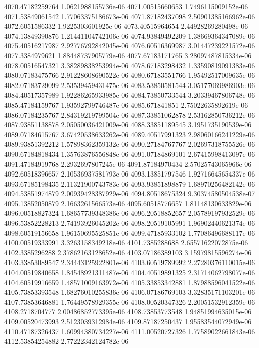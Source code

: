 {4070.47182259764 1.0621988155736e-06
4071.00515660653 1.7496115009152e-06
4071.53849061542 1.77063375186673e-06
4071.87182437098 2.50901385166962e-06
4072.6051586332 1.9225303601925e-06
4073.40515964654 2.44928269280498e-06
4074.13849390876 1.21441104742106e-06
4074.93849492209 1.38669364347089e-06
4075.40516217987 2.92776792842045e-06
4076.60516369987 3.01447239221572e-06
4077.3384979621 1.88448737905779e-06
4077.67183171765 3.28097487815334e-06
4078.00516547321 3.38289838253994e-06
4078.67183298432 1.33590819091383e-06
4080.07183475766 2.91228608690522e-06
4080.67183551766 1.95492517009635e-06
4082.07183729099 2.53539459431475e-06
4083.53850581544 3.05177069986903e-06
4084.40517357989 1.92286265933985e-06
4084.73850733544 3.20339467806748e-06
4085.47184159767 1.93592799746487e-06
4085.671841851 2.75022635892619e-06
4086.07184235767 2.84319219799504e-06
4087.33851062878 2.53162850736212e-06
4087.93851138878 2.05050036421009e-06
4088.33851189545 3.1951735190539e-06
4089.07184615767 3.67420538633262e-06
4089.40517991323 2.98060166241229e-06
4089.93851392212 1.57898362359132e-06
4090.27184767767 2.02697318755526e-06
4090.67184818434 1.35763876556848e-06
4091.07184869101 2.67415998413097e-06
4091.47184919768 2.2932697807245e-06
4091.87184970434 2.57025743065966e-06
4092.60518396657 2.10536937581793e-06
4093.13851797546 1.92716645654337e-06
4093.67185198435 2.11321900743783e-06
4093.93851898879 1.68970256482142e-06
4094.53851974879 2.00939428387929e-06
4094.80518675324 9.30374580504538e-07
4095.13852050879 2.1663261566573e-06
4095.60518776657 1.81148130633829e-06
4096.00518827324 1.68657739348386e-06
4096.20518852657 2.05789197932529e-06
4096.53852228213 2.74193926045202e-06
4098.20519105991 1.96902440621374e-06
4098.60519156658 1.96150695525851e-06
4099.47185933102 1.77086496688117e-06
4100.00519333991 3.3263158349218e-06
4101.7385288688 2.65571622072875e-06
4102.3385296288 2.37862163128652e-06
4103.07186389103 3.15979815596274e-06
4103.33853089547 2.34443125922801e-06
4103.60519789992 2.27280376110015e-06
4104.00519840658 1.84548921311487e-06
4104.40519891325 2.31714062798077e-06
4104.60519916659 1.48571009163972e-06
4105.33853342881 1.87988596041522e-06
4105.73853393548 1.68276010255836e-06
4106.07186769103 3.32835171103201e-06
4107.73853646881 1.76449578929355e-06
4108.00520347326 2.20051532912359e-06
4108.2718704777 2.00486852773395e-06
4108.73853773548 1.94851994635015e-06
4109.00520473993 2.5123039312984e-06
4109.87187250437 1.95583544072949e-06
4110.47187326437 1.60994380734227e-06
4111.00520727326 1.77589022661843e-06
4112.53854254882 2.77222342124782e-06
}

